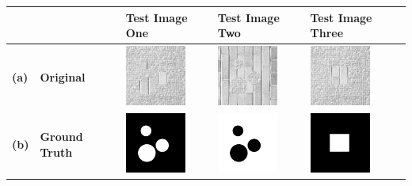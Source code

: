 \clearpage

\begin{minipage}{\linewidth}
	\begin{center}
	
		\begin{tabular}{>{\bfseries\centering}m{0.2in} >{\centering\bfseries}m{1in} >{\centering}m{1in} >{\centering}m{1in} >{\centering\arraybackslash}m{1in}}
			\hline
			&
			&
			\textbf{Test Image One}
			&
			\textbf{Test Image Two}
			&
			\textbf{Test Image Three}
			\\ 
			\hline
			(a)
			&
			Original
			&
			\includegraphics[width=75px, frame]{figures/accuracy_maps/original_brick_gravel_01.png}
			&
			\includegraphics[width=75px, frame]{figures/accuracy_maps/original_brick_gravel_02.png}
			& 
			\includegraphics[width=75px, frame]{figures/accuracy_maps/original_brick_gravel_03.png}
			\\ 
			\hline
			(b)
			&
			Ground Truth
			&
			\includegraphics[width=75px, frame]{figures/accuracy_maps/ground_truth_brick_gravel_01.png}
			&
			\includegraphics[width=75px, frame]{figures/accuracy_maps/ground_truth_brick_gravel_02.png}
			& 
			\includegraphics[width=75px, frame]{figures/accuracy_maps/ground_truth_brick_gravel_03.png}

\end{tabular}
\end{center}
\end{minipage}
